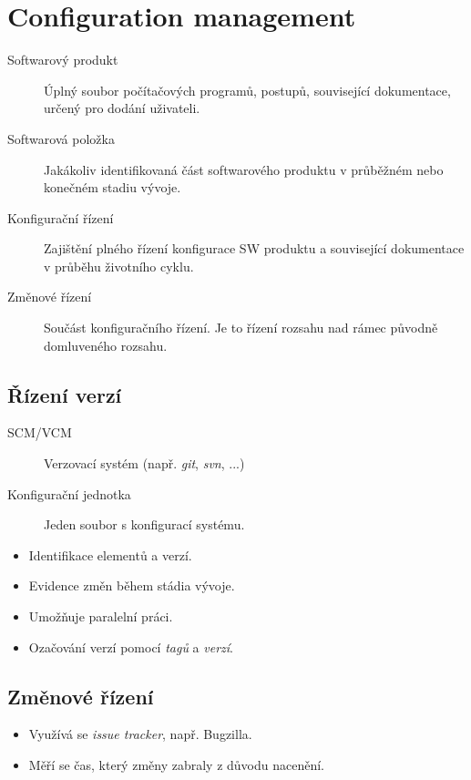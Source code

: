 \section{Configuration management}
  \begin{description}
    \item[Softwarový produkt] Úplný soubor počítačových programů, postupů, související dokumentace, určený pro dodání uživateli.
    \item[Softwarová položka] Jakákoliv identifikovaná část softwarového produktu v průběžném nebo konečném stadiu vývoje.
    \item[Konfigurační řízení] Zajištění plného řízení konfigurace SW produktu a související dokumentace v průběhu životního cyklu.
    \item[Změnové řízení] Součást konfiguračního řízení. Je to řízení rozsahu nad rámec původně domluveného rozsahu.
  \end{description}

  \subsection{Řízení verzí}
  \begin{description}
    \item[SCM/VCM] Verzovací systém (např. \emph{git}, \emph{svn}, ...)
    \item[Konfigurační jednotka] Jeden soubor s konfigurací systému.
  \end{description}

    \begin{itemize}
      \item Identifikace elementů a verzí.
      \item Evidence změn během stádia vývoje.
      \item Umožňuje paralelní práci.
      \item Ozačování verzí pomocí \emph{tagů} a \emph{verzí}.
    \end{itemize}

  \subsection{Změnové řízení}
    \begin{itemize}
      \item Využívá se \emph{issue tracker}, např. Bugzilla.
      \item Měří se čas, který změny zabraly z důvodu nacenění.
    \end{itemize}

